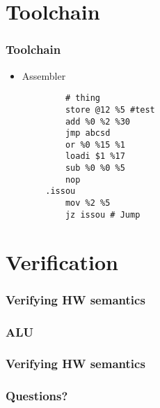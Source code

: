 \documentclass{beamer}
\begin{document}
\section{Toolchain}
\begin{frame}[fragile]
	\frametitle{Toolchain}
	\begin{itemize}
		\item Assembler
	\end{itemize}
	\begin{verbatim}
            # thing
            store @12 %5 #test
            add %0 %2 %30
            jmp abcsd
            or %0 %15 %1
            loadi $1 %17
            sub %0 %0 %5
            nop
        .issou
            mov %2 %5
            jz issou # Jump
        \end{verbatim}
\end{frame}

\section{Verification}
\begin{frame}
	\frametitle{Verifying HW semantics}
\end{frame}

\begin{frame}
	\frametitle{ALU}
\end{frame}

\begin{frame}
	\frametitle{Verifying HW semantics}
\end{frame}

\begin{frame}[fragile]
	\frametitle{Questions?}
\end{frame}

\newpage


\end{document}
